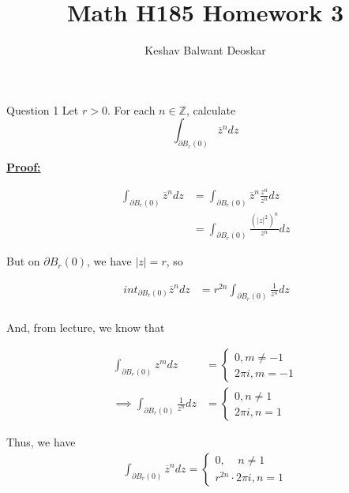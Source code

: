 \documentclass{article}
\title{Math H185 Homework 3}
\author{Keshav Balwant Deoskar}
\begin{document}
\maketitle


\begin{mathdefinitionbox}{Question 1}
\vskip 0.5cm
Let $r > 0$. For each $n \in \mathbb{Z}$, calculate 
\[ \int_{\partial B_r(0)} \overline{z}^n  dz \]
\end{mathdefinitionbox}

\vskip 0.5cm
\underline{\textbf{Proof:}}

\vskip 0.5cm
\begin{align*}
  \int_{\partial B_r(0)} \overline{z}^n dz &= \int_{\partial B_r(0)} \overline{z}^n \frac{z^n}{z^n} dz \\
  &= \int_{\partial B_r(0)} \frac{\left(|z|^2\right)^n}{z^n} dz 
\end{align*}

\vskip 0.5cm
But on $\partial B_r(0)$, we have $|z| = r$, so 

\begin{align*}
  \ int_{\partial B_r(0)} \overline{z}^n dz  &= r^{2n} \int_{\partial B_r(0)} \frac{1}{z^n} dz \\
\end{align*}

And, from lecture, we know that 
\begin{dottedbox}
  \begin{align*}
    \int_{\partial B_r(0)} z^m dz &= \begin{cases}
      0, m \neq -1 \\
      2\pi i, m = -1
    \end{cases} \\
    \implies \int_{\partial B_r(0)} \frac{1}{z^n} dz &= \begin{cases}
      0,  n\neq 1 \\
      2\pi i, n = 1
    \end{cases} 
  \end{align*}
\end{dottedbox}

\vskip 0.5cm
Thus, we have 
\begin{align*}
\boxed{  \int_{\partial B_r(0)} \overline{z}^n dz = \begin{cases}
  0, \;\;\;\;n \neq 1 \\
  r^{2n} \cdot 2\pi i, n = 1
\end{cases}}
\end{align*}
\end{document}
